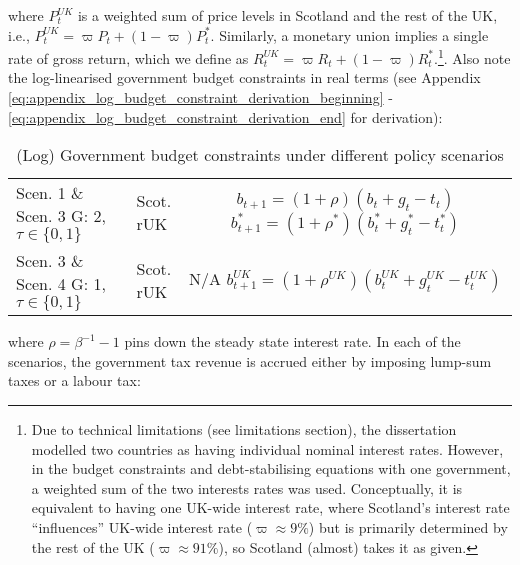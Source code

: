 where $P^{UK}_t$ is a weighted sum of price levels in Scotland and the rest of the UK, i.e., $P^{UK}_t = \varpi P_t + (1-\varpi)P^*_t$. Similarly, a monetary union implies a single rate of gross return, which we define as $R^{UK}_t = \varpi R_t + (1-\varpi)R^*_t$.\footnote{Due to technical limitations (see limitations section), the dissertation modelled two countries as having individual nominal interest rates. However, in the budget constraints and debt-stabilising equations with one government, a weighted sum of the two interests rates was used. Conceptually, it is equivalent to having one UK-wide interest rate, where Scotland's interest rate ``influences'' UK-wide interest rate ($\varpi \approx 9\%$) but is primarily determined by the rest of the UK ($\varpi \approx 91\%$), so Scotland (almost) takes it as given.}. Also note the log-linearised government budget constraints in real terms (see Appendix \ref{eq:appendix_log_budget_constraint_derivation_beginning} - \ref{eq:appendix_log_budget_constraint_derivation_end} for derivation):
\begin{table}[H]
    \renewcommand{\arraystretch}{2}
    \centering
    \begin{tabular}{l|l|c}
    \makecell{Scen. 1 \& Scen. 3\\ G: 2, $\tau \in \{0, 1\}$} & \makecell{Scot. \\ rUK } & 
        \makecell{
            $b_{t+1} = (1 + \rho)(b_t + g_t - t_t)$\\
            $b^*_{t+1} = (1 + \rho^*)(b^*_t + g^*_t - t^*_t)$
        }  \\ 
    \makecell{Scen. 3 \& Scen. 4\\ G: 1, $\tau \in \{0, 1\}$} & \makecell{Scot. \\ rUK } & 
        \makecell{
            N/A\\
            $b^{UK}_{t+1} = (1 + \rho^{UK})(b^{UK}_t + g^{UK}_t - t^{UK}_t)$
        } 
    \end{tabular}
    \caption{(Log) Government budget constraints under different policy scenarios}
\end{table}
where $\rho = \beta^{-1} - 1$ pins down the steady state interest rate. In each of the scenarios, the government tax revenue is accrued either by imposing lump-sum taxes or a labour tax:
